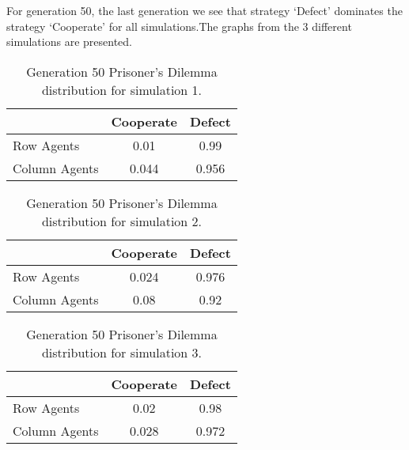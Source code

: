 For generation 50, the last generation we see that strategy `Defect' dominates the strategy `Cooperate' for all simulations.The graphs from the 3 different simulations are presented.

\begin{table}[H]
\begin{center}
\begin{tabular}{|l|c|c|}
\hline
& Cooperate & Defect \\ 
\hline
Row Agents & 0.01 & 0.99\\
\hline
Column Agents & 0.044 & 0.956\\
\hline
\end{tabular}
\end{center}
\caption{ Generation 50 Prisoner’s Dilemma distribution for simulation 1.}
\label{tab:pds1g50}
\end{table}

\begin{table}[H]
\begin{center}
\begin{tabular}{|l|c|c|}
\hline
& Cooperate & Defect \\ 
\hline
Row Agents & 0.024 & 0.976\\
\hline
Column Agents & 0.08 & 0.92\\
\hline
\end{tabular}
\end{center}
\caption{Generation 50 Prisoner’s Dilemma distribution for simulation 2.}
\label{tab:pds2g50}
 \end{table}

\begin{table}[H]
\begin{center}
\begin{tabular}{|l|c|c|}
\hline
& Cooperate & Defect \\ 
\hline
Row Agents & 0.02 & 0.98\\
\hline
Column Agents & 0.028 & 0.972\\
\hline
\end{tabular}
\end{center}
\caption{Generation 50 Prisoner’s Dilemma distribution for simulation 3.}
\label{tab:pds3g50}
 \end{table}

